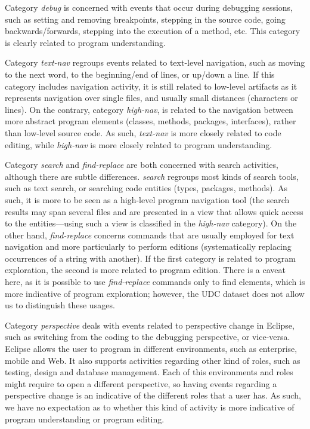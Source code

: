 \documentclass[times]{smrauth}
\newcommand\RR[1]{\textbf{Romain #1}}
\begin{document}
Category \emph{debug} is concerned with events that occur during debugging sessions, such as setting and removing breakpoints, stepping in the source code, going backwards/forwards, stepping into the execution of a method, etc. This category is clearly related to program understanding. 

Category \emph{text-nav} regroups events related to text-level navigation, such as moving to the next word, to the beginning/end of lines, or up/down a line. If this category includes navigation activity, it is still related to low-level artifacts as it represents navigation over single files, and usually small distances (characters or lines). On the contrary, category \emph{high-nav}, is related to the navigation between more abstract program elements (classes, methods, packages, interfaces), rather than low-level source code. As such, \emph{text-nav} is more closely related to code editing, while \emph{high-nav} is more closely related to program understanding.

Category \emph{search} and \emph{find-replace} are both concerned with search activities, although there are subtle differences. \emph{search} regroups most kinds of search tools, such as text search, or searching code entities (types, packages, methods). As such, it is more to be seen as a high-level program navigation tool (the search results may span several files and are presented in a view that allows quick access to the entities---using such a view is classified in the \emph{high-nav} category). On the other hand, \emph{find-replace} concerns commands that are usually employed for text navigation and more particularly to perform editions (systematically replacing occurrences of a string with another). If the first category is related to program exploration, the second is more related to program edition. There is a caveat here, as it is possible to use \emph{find-replace} commands only to find elements, which is more indicative of program exploration; however, the UDC dataset does not allow us to distinguish these usages.

Category \emph{perspective} deals with events related to perspective change in Eclipse, such as switching from the coding to the debugging perspective, or vice-versa. Eclipse allows the user to program in different environments, such as enterprise, mobile and Web. It also supports activities regarding other kind of roles, such as testing, design and database management. Each of this environments and roles might require to open a different perspective, so having events regarding a perspective change is an indicative of the different roles that a user has.
As such, we have no expectation as to whether this kind of activity is more indicative of program understanding or program editing. %
\end{document}
